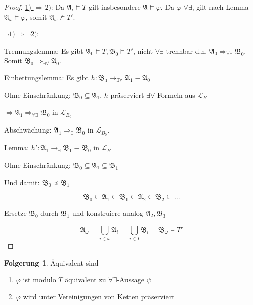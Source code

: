 \documentclass[12pt,parskip=full]{scrartcl}
\newcommand{\heading}{\underline}
\theoremstyle{definition}
\newtheorem{corollary}[theorem]{Folgerung}
\begin{document}
	\begin{proof}
		\heading{1) $\Rightarrow 2)$}: Da $\mathfrak{A}_i \models T$ gilt insbesondere $\mathfrak{A} \models \varphi$. Da $\varphi$ $\forall\exists$, gilt nach Lemma $\mathfrak{A}_\omega \models \varphi$, somit $\mathfrak{A}_\omega \not\models T'$.
		
		\heading{$\lnot 1) \Rightarrow \lnot 2)$}:
		
		Trennungslemma: Es gibt $\mathfrak{A}_0 \models T, \mathfrak{B}_0 \models T'$, nicht $\forall \exists$-trennbar d.h. $\mathfrak{A}_0 \Rightarrow_{\forall\exists} \mathfrak{B}_0$. Somit $\mathfrak{B}_0 \Rightarrow_{\exists\forall} \mathfrak{A}_0$.
		
		Einbettungslemma: Es gibt $h: \mathfrak{B}_0 \to_{\exists\forall} \mathfrak{A}_1 \equiv \mathfrak{A}_0$
		
		Ohne Einschränkung: $\mathfrak{B}_0 \subseteq \mathfrak{A}_1$, $h$ präserviert $\exists\forall$-Formeln aus $\mathcal{L}_{B_0}$
		
		$\Rightarrow \mathfrak{A}_1 \Rightarrow_{\forall\exists} \mathfrak{B}_0$ in $\mathcal{L}_{B_0}$
		
		Abschwächung: $\mathfrak{A}_1 \Rightarrow_\exists \mathfrak{B}_0$ in $\mathcal{L}_{B_0}$.
		
		Lemma: $h': \mathfrak{A}_1 \to_\exists \mathfrak{B}_1 \equiv \mathfrak{B}_0$ in $\mathcal{L}_{B_0}$
		
		Ohne Einschränkung: $\mathfrak{B}_0 \subseteq \mathfrak{A}_1 \subseteq \mathfrak{B}_1$
		
		Und damit: $\mathfrak{B}_0 \preccurlyeq \mathfrak{B}_1$
		
		\begin{equation*}
			\mathfrak{B}_0 \subseteq \mathfrak{A}_1 \subseteq \mathfrak{B}_1 \subseteq \mathfrak{A}_2 \subseteq \mathfrak{B}_2 \subseteq \dots
		\end{equation*}
		
		Ersetze $\mathfrak{B}_0$ durch $\mathfrak{B}_1$ und konstruiere analog $\mathfrak{A}_2, \mathfrak{B}_3$
		
		\begin{equation*}
			\mathfrak{A}_\omega = \bigcup_{i \in \omega} \mathfrak{A}_i = \bigcup_{i \in I} \mathfrak{B}_i = \mathfrak{B}_\omega \models T'
		\end{equation*}
	\end{proof}

	\begin{corollary}
		Äquivalent sind
		\begin{enumerate}
			\item $\varphi$ ist modulo $T$ äquivalent zu $\forall\exists$-Aussage $\psi$
			\item $\varphi$ wird unter Vereinigungen von Ketten präserviert
		\end{enumerate}
	\end{corollary}
\end{document}
